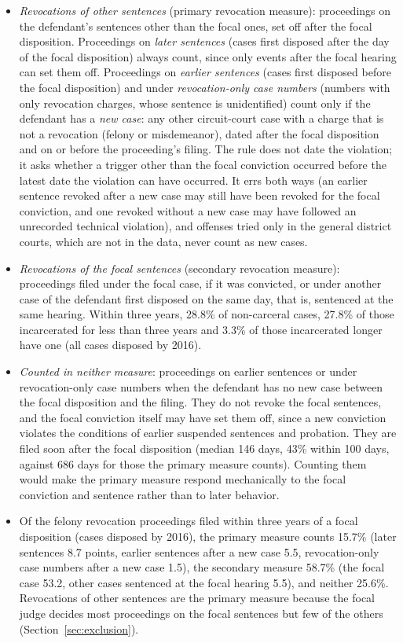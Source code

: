 \documentclass[11pt]{article}
\begin{document}
\begin{itemize}
  \item \emph{Revocations of other sentences} (primary revocation measure): proceedings on the defendant's sentences other than the focal ones, set off after the focal disposition. Proceedings on \emph{later sentences} (cases first disposed after the day of the focal disposition) always count, since only events after the focal hearing can set them off. Proceedings on \emph{earlier sentences} (cases first disposed before the focal disposition) and under \emph{revocation-only case numbers} (numbers with only revocation charges, whose sentence is unidentified) count only if the defendant has a \emph{new case}: any other circuit-court case with a charge that is not a revocation (felony or misdemeanor), dated after the focal disposition and on or before the proceeding's filing. The rule does not date the violation; it asks whether a trigger other than the focal conviction occurred before the latest date the violation can have occurred. It errs both ways (an earlier sentence revoked after a new case may still have been revoked for the focal conviction, and one revoked without a new case may have followed an unrecorded technical violation), and offenses tried only in the general district courts, which are not in the data, never count as new cases.
  \item \emph{Revocations of the focal sentences} (secondary revocation measure): proceedings filed under the focal case, if it was convicted, or under another case of the defendant first disposed on the same day, that is, sentenced at the same hearing. Within three years, 28.8\% of non-carceral cases, 27.8\% of those incarcerated for less than three years and 3.3\% of those incarcerated longer have one (all cases disposed by 2016).
  \item \emph{Counted in neither measure}: proceedings on earlier sentences or under revocation-only case numbers when the defendant has no new case between the focal disposition and the filing. They do not revoke the focal sentences, and the focal conviction itself may have set them off, since a new conviction violates the conditions of earlier suspended sentences and probation. They are filed soon after the focal disposition (median 146 days, 43\% within 100 days, against 686 days for those the primary measure counts). Counting them would make the primary measure respond mechanically to the focal conviction and sentence rather than to later behavior.
  \item[] Of the felony revocation proceedings filed within three years of a focal disposition (cases disposed by 2016), the primary measure counts 15.7\% (later sentences 8.7 points, earlier sentences after a new case 5.5, revocation-only case numbers after a new case 1.5), the secondary measure 58.7\% (the focal case 53.2, other cases sentenced at the focal hearing 5.5), and neither 25.6\%. Revocations of other sentences are the primary measure because the focal judge decides most proceedings on the focal sentences but few of the others (Section~\ref{sec:exclusion}).
\end{itemize}
\end{document}
